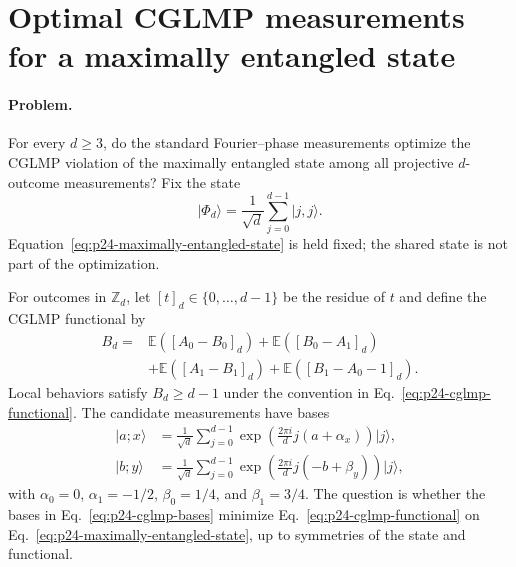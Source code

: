 \section{Optimal CGLMP measurements for a maximally entangled state}
\label{sec:problem-24}

\paragraph{Problem.}
For every $d\geq3$, do the standard Fourier--phase measurements optimize the
CGLMP violation of the maximally entangled state among all projective
$d$-outcome measurements?  Fix the state
\begin{equation}
  \lvert\Phi_d\rangle
  =\frac{1}{\sqrt d}\sum_{j=0}^{d-1}\lvert j,j\rangle.
  \label{eq:p24-maximally-entangled-state}
\end{equation}
Equation~\eqref{eq:p24-maximally-entangled-state} is held fixed; the shared
state is not part of the optimization.

For outcomes in $\mathbb Z_d$, let $[t]_d\in\{0,\ldots,d-1\}$ be the residue
of $t$ and define the CGLMP functional by
\begin{equation}
  \begin{aligned}
    B_d={}&\mathbb E([A_0-B_0]_d)+\mathbb E([B_0-A_1]_d)\\
          &+\mathbb E([A_1-B_1]_d)+\mathbb E([B_1-A_0-1]_d).
  \end{aligned}
  \label{eq:p24-cglmp-functional}
\end{equation}
Local behaviors satisfy $B_d\geq d-1$ under the convention in
Eq.~\eqref{eq:p24-cglmp-functional}.  The candidate measurements have bases
\begin{equation}
  \begin{aligned}
    \lvert a;x\rangle
      &=\frac{1}{\sqrt d}\sum_{j=0}^{d-1}
        \exp\!\left(\frac{2\pi i}{d}j(a+\alpha_x)\right)\lvert j\rangle,\\
    \lvert b;y\rangle
      &=\frac{1}{\sqrt d}\sum_{j=0}^{d-1}
        \exp\!\left(\frac{2\pi i}{d}j(-b+\beta_y)\right)\lvert j\rangle,
  \end{aligned}
  \label{eq:p24-cglmp-bases}
\end{equation}
with $\alpha_0=0$, $\alpha_1=-1/2$, $\beta_0=1/4$, and $\beta_1=3/4$.
The question is whether the bases in Eq.~\eqref{eq:p24-cglmp-bases} minimize
Eq.~\eqref{eq:p24-cglmp-functional} on
Eq.~\eqref{eq:p24-maximally-entangled-state}, up to symmetries of the state
and functional.

